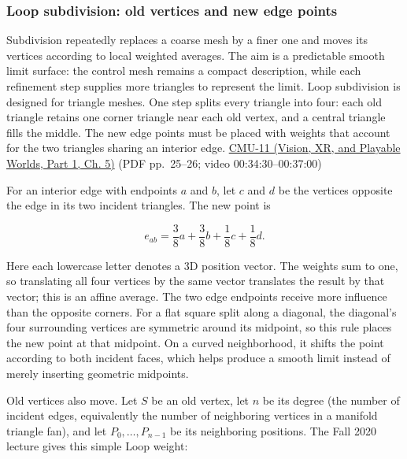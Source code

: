 \hypertarget{03-visual-computing-i-ch002-subdivision-masks-and-quadric-error-are-computable-rules-not-labels}{}

\subsubsection{Loop subdivision: old vertices and new edge points}\label{03-visual-computing-i-ch002-loop-subdivision-old-vertices-and-new-edge-points}

\hypertarget{03-visual-computing-i-ch002-loop-subdivision-old-vertices-and-new-edge-points}{}

Subdivision repeatedly replaces a coarse mesh by a finer one and moves its vertices according to local weighted averages. The aim is a predictable smooth limit surface: the control mesh remains a compact description, while each refinement step supplies more triangles to represent the limit. Loop subdivision is designed for triangle meshes. One step splits every triangle into four: each old triangle retains one corner triangle near each old vertex, and a central triangle fills the middle. The new edge points must be placed with weights that account for the two triangles sharing an interior edge. \href{../07-Vision-XR-and-Playable-Worlds-P01/main.pdf\#nameddest=04-visual-computing-ii-ch036-cmu-11---digital-geometry-processing}{CMU-11 (Vision, XR, and Playable Worlds, Part 1, Ch. 5)} (PDF pp.~25--26; video 00:34:30--00:37:00)

For an interior edge with endpoints \(a\) and \(b\), let \(c\) and \(d\) be the vertices opposite the edge in its two incident triangles. The new point is

\[
e_{ab}=\frac{3}{8}a+\frac{3}{8}b+\frac{1}{8}c+\frac{1}{8}d.
\]

Here each lowercase letter denotes a 3D position vector. The weights sum to one, so translating all four vertices by the same vector translates the result by that vector; this is an affine average. The two edge endpoints receive more influence than the opposite corners. For a flat square split along a diagonal, the diagonal's four surrounding vertices are symmetric around its midpoint, so this rule places the new point at that midpoint. On a curved neighborhood, it shifts the point according to both incident faces, which helps produce a smooth limit instead of merely inserting geometric midpoints.

Old vertices also move. Let \(S\) be an old vertex, let \(n\) be its degree (the number of incident edges, equivalently the number of neighboring vertices in a manifold triangle fan), and let \(P_0,\ldots,P_{n-1}\) be its neighboring positions. The Fall 2020 lecture gives this simple Loop weight:


